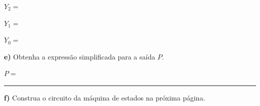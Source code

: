 \documentclass[a4paper,12pt,notitlepage]{article}
\begin{document}
\begin{multicols}{2}
\vfill

\noindent
$Y_2 =$ {\vcolor\hrulefill}

\vfill

\noindent
$Y_1 =$ {\vcolor\hrulefill}\\[16pt]
{\vcolor\hrulefill}

\vfill

\noindent
$Y_0 =$ {\vcolor\hrulefill}\\[16pt]
{\vcolor\hrulefill}

\end{multicols}

\newpage

\noindent
\textbf{e)} Obtenha a expressão simplificada para a saída $P$.

\begin{center}
$P =$ \rule{4cm}{0.4pt}
\end{center}

\begin{center}
\end{center}

\noindent
\textbf{f)} Construa o circuito da máquina de estados na próxima página.

\newpage

\noindent
{}
\end{document}
